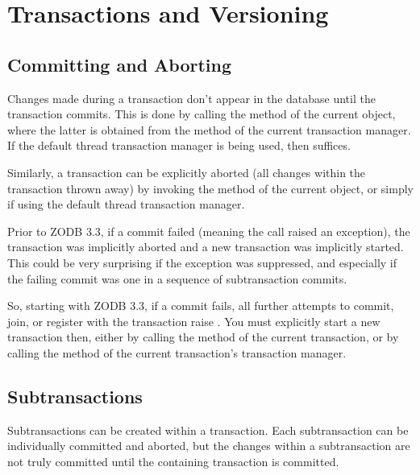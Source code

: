 

\section{Transactions and Versioning}

\subsection{Committing and Aborting}

Changes made during a transaction don't appear in the database until
the transaction commits.  This is done by calling the 
method of the current  object, where the latter is
obtained from the  method of the current transaction
manager.  If the default thread transaction manager is being used, then
 suffices.

Similarly, a transaction can be explicitly aborted (all changes within
the transaction thrown away) by invoking the  method
of the current  object, or simply
 if using the default thread transaction manager.

Prior to ZODB 3.3, if a commit failed (meaning the  call
raised an exception), the transaction was implicitly aborted and a new
transaction was implicitly started.  This could be very surprising if the
exception was suppressed, and especially if the failing commit was one
in a sequence of subtransaction commits.

So, starting with ZODB 3.3, if a commit fails, all further attempts to
commit, join, or register with the transaction raise
.  You must explicitly
start a new transaction then, either by calling the  method
of the current transaction, or by calling the  method of the
current transaction's transaction manager.

\subsection{Subtransactions}

Subtransactions can be created within a transaction.  Each
subtransaction can be individually committed and aborted, but the
changes within a subtransaction are not truly committed until the
containing transaction is committed.

